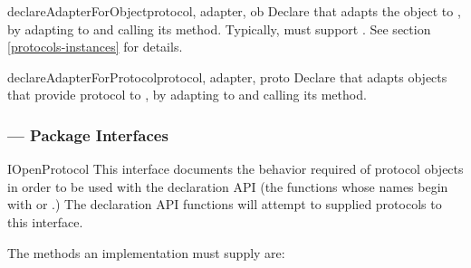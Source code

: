 \begin{verbatim%
}
\begin{verbatim%
}
\begin{verbatim%
}
\begin{verbatim%
}
\begin{verbatim%
}
\begin{verbatim%
}
\begin{funcdesc}{declareAdapterForObject}{protocol, adapter, ob }
Declare that  adapts the object  to , by
adapting  to  and calling its
 method.  Typically,  must support
.  See section \ref{protocols-instances} for details.
\end{funcdesc}


\begin{funcdesc}{declareAdapterForProtocol}{protocol, adapter, proto }
Declare that  adapts objects that provide protocol 
to , by adapting  to  and
calling its  method.
\end{funcdesc}
















\subsubsection{ --- Package Interfaces\label{protocol-interfaces-module}}


\begin{classdesc*}{IOpenProtocol}
This interface documents the behavior required of protocol objects in order to
be used with the  declaration API (the functions whose names
begin with  or .)  The declaration API functions
will attempt to  supplied protocols to this interface.

The methods an  implementation must supply are:


\end{classdesc*}
\end{verbatim%
}
\end{verbatim%
}
\end{verbatim%
}
\end{verbatim%
}
\end{verbatim%
}
\end{verbatim%
}
